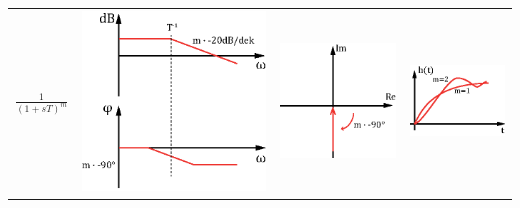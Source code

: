 \begin{tabular}{>{\centering\arraybackslash}p{1.5cm}|>{\centering\arraybackslash}p{2.5cm}|>{\centering\arraybackslash}p{2cm}|>{\centering\arraybackslash}p{2.5cm}}
\hline \rule[-2ex]{0pt}{5.5ex} $\frac{1}{(1+sT)^m}$ & \includegraphics[scale = 0.3]{images/bode_1stm.eps} & \includegraphics[scale = 0.4]{images/ort_1stm.eps} & \includegraphics[scale = 0.5]{images/spr_1stm.eps} \\ 

\end{tabular}
